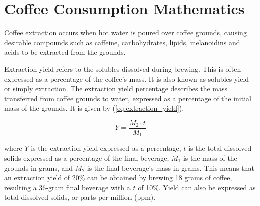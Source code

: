 


\section{Coffee Consumption Mathematics}

Coffee extraction occurs when hot water is poured over coffee grounds, causing
desirable compounds such as caffeine, carbohydrates, lipids, melanoidins and
acids to be extracted from the grounds.

Extraction yield refers to the solubles dissolved during brewing. This is often
expressed as a percentage of the coffee's mass. It is also known as solubles
yield or simply extraction. The extraction yield percentage describes the mass
transferred from coffee grounds to water, expressed as a percentage of the
initial mass of the grounds. It is given by (\ref{eq:extraction_yield}).

\begin{equation}\label{eq:extraction_yield}
    Y = \frac{M_2 \cdot t}{M_1}
\end{equation}

where $Y$ is the extraction yield expressed as a percentage, $t$ is the total
dissolved solids expressed as a percentage of the final beverage, $M_1$ is the
mass of the grounds in grams, and $M_2$ is the final beverage's mass in grams.
This means that an extraction yield of 20\% can be obtained by brewing 18 grams
of coffee, resulting a 36-gram final beverage with a $t$ of 10\%. Yield can also
be expressed as total dissolved solids, or parts-per-million (ppm).
